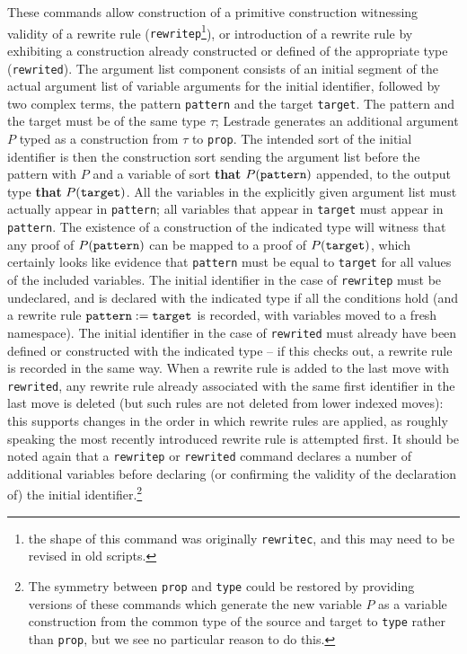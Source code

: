 \documentclass[12pt]{article}
\begin{document}
\begin{description}
These commands allow construction of a primitive construction witnessing validity of a rewrite rule ({\tt rewritep}\footnote{the shape of this command was originally {\tt rewritec}, and this may need to be revised in old scripts.}), or introduction of a rewrite rule by exhibiting a construction already constructed or defined of the appropriate type ({\tt rewrited}).  The argument list component consists of an initial segment of the actual argument list of variable arguments for the initial identifier, followed by two complex terms, the pattern {\tt pattern} and the target {\tt target}.  The pattern and the target must be of the same type $\tau$;  Lestrade generates an additional argument $P$ typed as a construction from $\tau$ to {\tt prop}.     The intended sort of the initial identifier is then the construction sort sending the argument list before the pattern  with $P$ and a variable of sort {\bf that} $P({\tt pattern})$ appended, to the output type
{\bf that} $P({\tt target})$.  All the variables in the explicitly given argument list must actually appear in {\tt pattern}; all variables that appear in {\tt target} must appear in {\tt pattern}.  The existence of a construction of the indicated type will witness that any proof of $P({\tt pattern})$ can be mapped to a proof of $P({\tt target})$, which certainly looks like evidence that {\tt pattern} must be equal to {\tt target} for all values of the included variables.  The initial identifier in the case of {\tt rewritep} must be undeclared, and is declared with the indicated type if all the conditions hold (and a rewrite rule ${\tt pattern} := {\tt target}$ is recorded, with variables moved to a fresh namespace).  The initial identifier
in the case of {\tt rewrited} must already have been defined or constructed with the indicated type -- if this checks out, a rewrite rule is recorded in the same way.  When a rewrite rule is added to the last move with {\tt rewrited}, any rewrite rule already associated with the same first identifier in the last move  is deleted (but such rules are not deleted from lower indexed moves):  this supports changes in the order in which rewrite rules are applied, as roughly speaking the most recently introduced rewrite rule is attempted first.  It should be noted again that a {\tt rewritep} or {\tt rewrited} command declares a number of additional variables before declaring (or confirming the validity of the declaration of) the initial identifier.\footnote{The symmetry between {\tt prop} and {\tt type} could be restored by providing versions of these commands which generate the new variable $P$ as a variable construction from the common type of the source and target to {\tt type} rather than {\tt prop}, but we see no particular reason to do this.}

\end{description}
\end{document}

